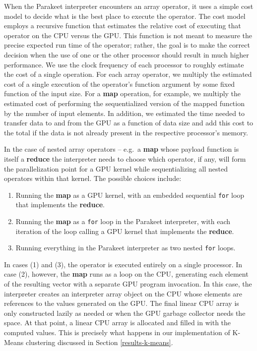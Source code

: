 \documentclass[10pt,twocolumn]{article}
\begin{document}
When the Parakeet interpreter encounters an array operator, it uses a simple cost model to decide what is the best place to execute the operator.  The cost model employs a recursive function that estimates the relative cost of executing that operator on the CPU versus the GPU.  This function is not meant to measure the precise expected run time of the operator; rather, the goal is to make the correct decision when the use of one or the other processor should result in much higher performance.  We use the clock frequency of each processor to roughly estimate the cost of a single operation.  For each array operator, we multiply the estimated cost of a single execution of the operator's function argument by some fixed function of the input size.  For a \textbf{map} operation, for example, we multiply the estimated cost of performing the sequentialized version of the mapped function by the number of input elements. In addition, we estimated the time needed to transfer data to and from the GPU as a function of data size and add this cost to the total if the data is not already present in the respective processor's memory.

In the case of nested array operators -- e.g.~a \textbf{map} whose payload function is itself a \textbf{reduce} the interpreter needs to choose which operator, if any, will form the parallelization point for a GPU kernel while sequentializing all nested operators within that kernel.  The possible choices include:

\begin{enumerate}
\item Running the \textbf{map} as a GPU kernel, with an embedded sequential \texttt{for} loop that implements the \textbf{reduce}.
\item Running the \textbf{map} as a \texttt{for} loop in the Parakeet interpreter, with each iteration of the loop calling a GPU kernel that implements the \textbf{reduce}.
\item Running everything in the Parakeet interpreter as two nested \texttt{for} loops.
\end{enumerate}

In cases (1) and (3), the operator is executed entirely on a single processor.  In case (2), however, the \textbf{map} runs as a loop on the CPU, generating each element of the resulting vector with a separate GPU program invocation.  In this case, the interpreter creates an interpreter array object on the CPU whose elements are references to the values generated on the GPU.  The final linear CPU array is only constructed lazily as needed or when the GPU garbage collector needs the space.  At that point, a linear CPU array is allocated and filled in with the computed values.  This is precisely what happens in our implementation of K-Means clustering discussed in Section \ref{results-k-means}.
\end{document}
